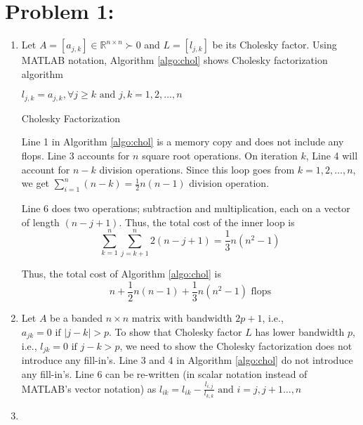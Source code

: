 \section*{Problem 1:}
\begin{enumerate}
\item Let $A = [a_{j,k}] \in \mathbb{R}^{n\times n} \succ 0$ and $L = [l_{j,k}]$ be its Cholesky factor. Using MATLAB notation, Algorithm \ref{algo:chol} shows Cholesky factorization algorithm

\begin{algorithm}[H]
\SetAlgoLined
{}
 $l_{j,k} = a_{j,k}, \forall j\geq k \text{\ and\ }  j,k= 1,2, \ldots, n$ \\
 \caption{Cholesky Factorization}
\label{algo:chol}
\end{algorithm}

\noindent Line 1 in Algorithm \ref{algo:chol} is a memory copy and does not include any flops. Line 3 accounts for $n$ square root operations. On iteration $k$, Line 4 will account for $n-k$ division operations. Since this loop goes from $k= 1,2, \ldots, n $, we get $\sum_{i=1}^{n}(n-k) = \frac{1}{2}n(n-1)$ division operation.

\noindent Line 6 does two operations; subtraction and multiplication, each on a vector of length $(n-j+1)$. Thus, the total cost of the inner loop is 
$$
\sum_{k=1}^{n} \sum_{j=k+1}^{n} 2(n-j+1) = \frac{1}{3}n(n^{2}-1)
$$

Thus, the total cost of Algorithm \ref{algo:chol} is 
$$
n + \frac{1}{2}n(n-1) + \frac{1}{3}n(n^2-1) \text{\ flops}
$$

\item 
Let $A$ be a banded $n\times n$ matrix with bandwidth $2p+1$, i.e., $a_{jk}=0 \text{\ if\ } |j-k|>p$. To show that Cholesky factor $L$ has lower bandwidth $p$, i.e.,  $l_{jk}=0 \text{\ if\ } j-k>p$, we need to show the Cholesky factorization does not introduce any fill-in's. Line 3 and 4 in Algorithm \ref{algo:chol} do not introduce any fill-in's. Line 6 can be re-written (in scalar notation instead of MATLAB's vector notation) as 
$
l_{ik} = l_{ik} - \frac{l_{i,j}}{l_{k,k}} \text{\ and \ } i= j, j+1 \ldots, n
$


 
\item 
\end{enumerate}